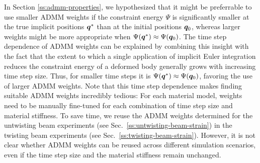 In Section \ref{ss:admm-properties}, we hypothesized that it might be preferrable to use smaller ADMM weights if the constraint energy $\Psi$ is significantly smaller at the true 
implicit positions $\bm{q}^*$ than at the initial positions $\bm{q}_0$, whereas larger weights might be more appropriate when $\Psi(\bm{q}^*) \approx \Psi(\bm{q}_0)$.
The time step dependence of ADMM weights can be explained by combining this insight with the fact that the extent to which a single application of implicit Euler integration 
reduces the constraint energy of a deformed body generally grows with increasing time step size. Thus, for smaller time steps it is 
$\Psi(\bm{q}^*) \approx \Psi(\bm{q}_0)$, favoring the use of larger ADMM weights. Note that this time step dependence 
makes finding suitable ADMM weights incredibly tedious: For each material model, weights need to be manually fine-tuned for each combination of time step size and 
material stiffness. To save time, we reuse the ADMM weights determined for the untwisting beam experiments (see Sec.\ \ref{ss:untwisting-beam-strain}) in the twisting 
beam experiments (see Sec.\ \ref{ss:twisting-beam-strain}). However, it is not clear whether ADMM weights can be reused across different simulation scenarios, even if the time step 
size and the material stiffness remain unchanged.

